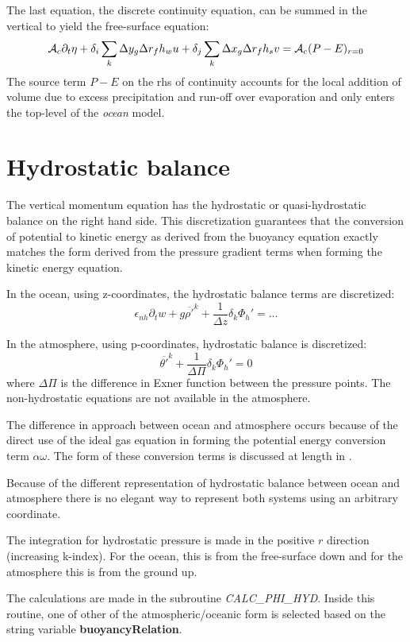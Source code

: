 The last equation, the discrete continuity equation, can be summed in
the vertical to yield the free-surface equation:
\begin{equation}
{\cal A}_c \partial_t \eta + \delta_i \sum_k \Delta y_g \Delta r_f h_w
u + \delta_j \sum_k \Delta x_g \Delta r_f h_s v = {\cal
A}_c(P-E)_{r=0} \label{eq:discrete-freesurface}
\end{equation}
The source term $P-E$ on the rhs of continuity accounts for the local
addition of volume due to excess precipitation and run-off over
evaporation and only enters the top-level of the {\em ocean} model.

\section{Hydrostatic balance}

The vertical momentum equation has the hydrostatic or
quasi-hydrostatic balance on the right hand side. This discretization
guarantees that the conversion of potential to kinetic energy as
derived from the buoyancy equation exactly matches the form derived
from the pressure gradient terms when forming the kinetic energy
equation.

In the ocean, using z-coordinates, the hydrostatic balance terms are
discretized:
\begin{equation}
\epsilon_{nh} \partial_t w
+ g \overline{\rho'}^k + \frac{1}{\Delta z} \delta_k \Phi_h' = \ldots
\label{eq:discrete_hydro_ocean}
\end{equation}

In the atmosphere, using p-coordinates, hydrostatic balance is
discretized:
\begin{equation}
\overline{\theta'}^k + \frac{1}{\Delta \Pi} \delta_k \Phi_h' = 0
\label{eq:discrete_hydro_atmos}
\end{equation}
where $\Delta \Pi$ is the difference in Exner function between the
pressure points. The non-hydrostatic equations are not available in
the atmosphere.

The difference in approach between ocean and atmosphere occurs because
of the direct use of the ideal gas equation in forming the potential
energy conversion term $\alpha \omega$. The form of these conversion
terms is discussed at length in \cite{adcroft:02}.

Because of the different representation of hydrostatic balance between
ocean and atmosphere there is no elegant way to represent both systems
using an arbitrary coordinate.

The integration for hydrostatic pressure is made in the positive $r$
direction (increasing k-index). For the ocean, this is from the
free-surface down and for the atmosphere this is from the ground up.

The calculations are made in the subroutine {\em
CALC\_PHI\_HYD}. Inside this routine, one of other of the
atmospheric/oceanic form is selected based on the string variable {\bf
buoyancyRelation}.

